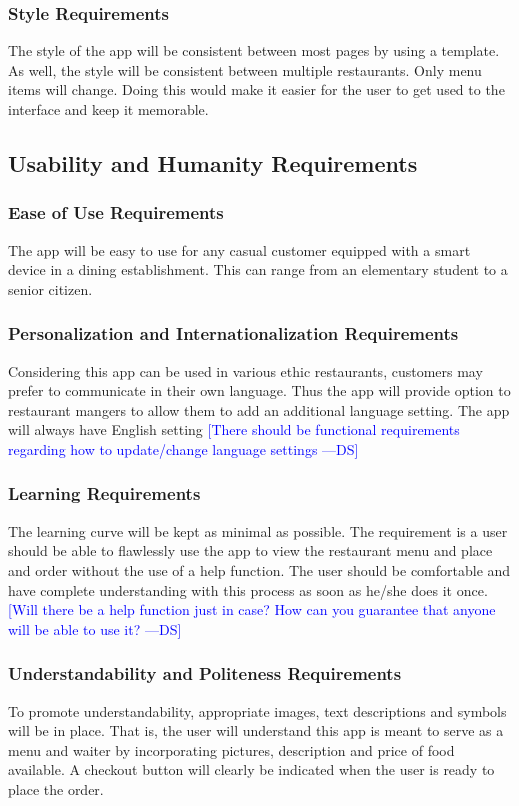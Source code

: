 \documentclass[12pt, titlepage]{article}
\newcommand{\authornote}[3]{\textcolor{#1}{[#3 ---#2]}}
\newcommand{\authornote}[3]{}
\newcommand{\ds}[1]{\authornote{blue}{DS}{#1}}
\begin{document}
\subsubsection{Style Requirements}
The style of the app will be consistent between most pages by using a template. As well, the style will be consistent between multiple restaurants. Only menu items will change. Doing this would make it easier for the user to get used to the interface and keep it memorable.
\subsection{Usability and Humanity Requirements}
\subsubsection{Ease of Use Requirements}
 The app will be easy to use for any casual customer equipped with a smart device in a dining establishment. This can range from an elementary student to a senior citizen.  
\subsubsection{Personalization and Internationalization Requirements}
Considering this app can be used in various ethic restaurants, customers may prefer to communicate in their own language. Thus the app will provide option to restaurant mangers to allow them to add an additional language setting. The app will always have English setting
 \ds{There should be functional requirements regarding how to update/change
 language settings}
\subsubsection{Learning Requirements}
The learning curve will be kept as minimal as possible. The requirement is a user should be able to flawlessly use the app to view the restaurant menu and place and order without the use of a help function. The user should be comfortable and have complete understanding with this process as soon as he/she does it once.
\ds{Will there be a help function just in case? 
How can you guarantee that anyone will be able to use it?}

\subsubsection{Understandability and Politeness Requirements}
To promote understandability, appropriate images, text descriptions and symbols will be in place. That is, the user will understand this app is meant to serve as a menu and waiter by incorporating pictures, description and price of food available. A checkout button will clearly be indicated when the user is ready to place the order.
\end{document}
